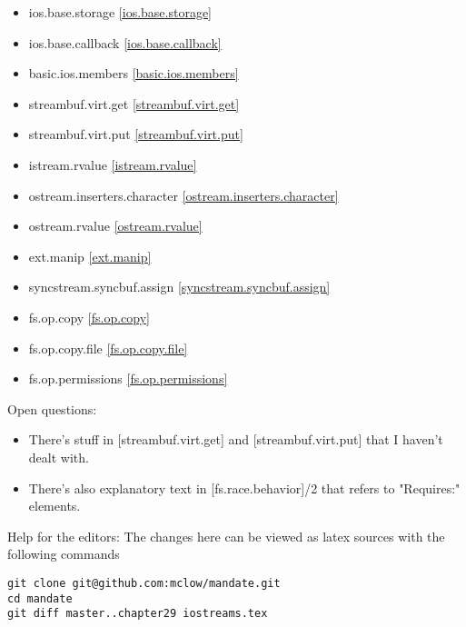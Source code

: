 \begin{multicols}{2}
\begin{itemize}
\item{ios.base.storage}				\ref{ios.base.storage}
\item{ios.base.callback}			\ref{ios.base.callback}
\item{basic.ios.members}			\ref{basic.ios.members}
\item{streambuf.virt.get}			\ref{streambuf.virt.get}
\item{streambuf.virt.put}			\ref{streambuf.virt.put}
\item{istream.rvalue}				\ref{istream.rvalue}
\item{ostream.inserters.character}	\ref{ostream.inserters.character}
\item{ostream.rvalue}				\ref{ostream.rvalue}
\item{ext.manip}					\ref{ext.manip}
\item{syncstream.syncbuf.assign}	\ref{syncstream.syncbuf.assign}
\item{fs.op.copy}					\ref{fs.op.copy}
\item{fs.op.copy.file}				\ref{fs.op.copy.file}
\item{fs.op.permissions}			\ref{fs.op.permissions}
\end{itemize}
\end{multicols}


Open questions:
\begin{itemize}
\item{There's stuff in [streambuf.virt.get] and [streambuf.virt.put] that I haven't dealt with.}
\item{There's also explanatory text in [fs.race.behavior]/2 that refers to "Requires:" elements.}
\end{itemize}



\vfill
Help for the editors: The changes here can be viewed as latex sources with the following commands
\begin{verbatim}
git clone git@github.com:mclow/mandate.git
cd mandate
git diff master..chapter29 iostreams.tex
\end{verbatim}

